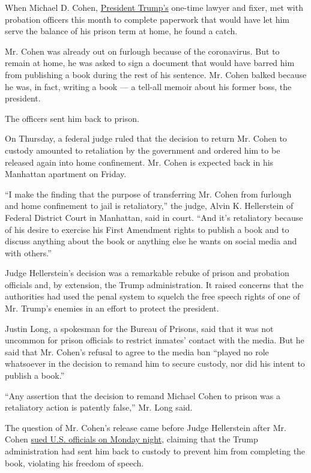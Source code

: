 When Michael D. Cohen,
\href{https://www.nytimes.com/2020/07/23/us/politics/person-woman-man-camera-tv-trump.html}{President
Trump's} one-time lawyer and fixer, met with probation officers this
month to complete paperwork that would have let him serve the balance of
his prison term at home, he found a catch.

Mr. Cohen was already out on furlough because of the coronavirus. But to
remain at home, he was asked to sign a document that would have barred
him from publishing a book during the rest of his sentence. Mr. Cohen
balked because he was, in fact, writing a book --- a tell-all memoir
about his former boss, the president.

The officers sent him back to prison.

On Thursday, a federal judge ruled that the decision to return Mr. Cohen
to custody amounted to retaliation by the government and ordered him to
be released again into home confinement. Mr. Cohen is expected back in
his Manhattan apartment on Friday.

``I make the finding that the purpose of transferring Mr. Cohen from
furlough and home confinement to jail is retaliatory,'' the judge, Alvin
K. Hellerstein of Federal District Court in Manhattan, said in court.
``And it's retaliatory because of his desire to exercise his First
Amendment rights to publish a book and to discuss anything about the
book or anything else he wants on social media and with others.''

Judge Hellerstein's decision was a remarkable rebuke of prison and
probation officials and, by extension, the Trump administration. It
raised concerns that the authorities had used the penal system to
squelch the free speech rights of one of Mr. Trump's enemies in an
effort to protect the president.

Justin Long, a spokesman for the Bureau of Prisons, said that it was not
uncommon for prison officials to restrict inmates' contact with the
media. But he said that Mr. Cohen's refusal to agree to the media ban
``played no role whatsoever in the decision to remand him to secure
custody, nor did his intent to publish a book.''

``Any assertion that the decision to remand Michael Cohen to prison was
a retaliatory action is patently false,'' Mr. Long said.

The question of Mr. Cohen's release came before Judge Hellerstein after
Mr. Cohen
\href{https://www.nytimes.com/2020/07/21/nyregion/michael-cohen-trump-book.html?searchResultPosition=1}{sued
U.S. officials on Monday night}, claiming that the Trump administration
had sent him back to custody to prevent him from completing the book,
violating his freedom of speech.

